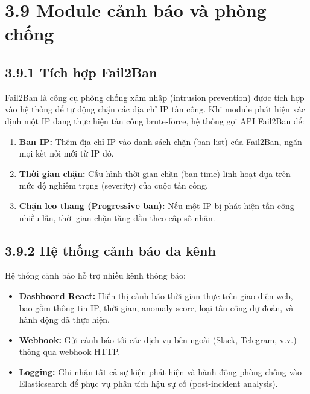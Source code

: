 \documentclass[
  a4paper]{report}
\providecommand{\tightlist}{%
  \setlength{\itemsep}{0pt}\setlength{\parskip}{0pt}}
\begin{document}
\section{3.9 Module cảnh báo và phòng
chống}\label{module-cux1ea3nh-buxe1o-vuxe0-phuxf2ng-chux1ed1ng}

\subsection{3.9.1 Tích hợp Fail2Ban}\label{tuxedch-hux1ee3p-fail2ban}

Fail2Ban là công cụ phòng chống xâm nhập (intrusion prevention) được
tích hợp vào hệ thống để tự động chặn các địa chỉ IP tấn công. Khi
module phát hiện xác định một IP đang thực hiện tấn công brute-force, hệ
thống gọi API Fail2Ban để:

\begin{enumerate}
\def\labelenumi{\arabic{enumi}.}
\tightlist
\item
  \textbf{Ban IP:} Thêm địa chỉ IP vào danh sách chặn (ban list) của
  Fail2Ban, ngăn mọi kết nối mới từ IP đó.
\item
  \textbf{Thời gian chặn:} Cấu hình thời gian chặn (ban time) linh hoạt
  dựa trên mức độ nghiêm trọng (severity) của cuộc tấn công.
\item
  \textbf{Chặn leo thang (Progressive ban):} Nếu một IP bị phát hiện tấn
  công nhiều lần, thời gian chặn tăng dần theo cấp số nhân.
\end{enumerate}

\subsection{3.9.2 Hệ thống cảnh báo đa
kênh}\label{hux1ec7-thux1ed1ng-cux1ea3nh-buxe1o-ux111a-kuxeanh}

Hệ thống cảnh báo hỗ trợ nhiều kênh thông báo:

\begin{itemize}
\tightlist
\item
  \textbf{Dashboard React:} Hiển thị cảnh báo thời gian thực trên giao
  diện web, bao gồm thông tin IP, thời gian, anomaly score, loại tấn
  công dự đoán, và hành động đã thực hiện.
\item
  \textbf{Webhook:} Gửi cảnh báo tới các dịch vụ bên ngoài (Slack,
  Telegram, v.v.) thông qua webhook HTTP.
\item
  \textbf{Logging:} Ghi nhận tất cả sự kiện phát hiện và hành động phòng
  chống vào Elasticsearch để phục vụ phân tích hậu sự cố (post-incident
  analysis).
\end{itemize}
\end{document}
